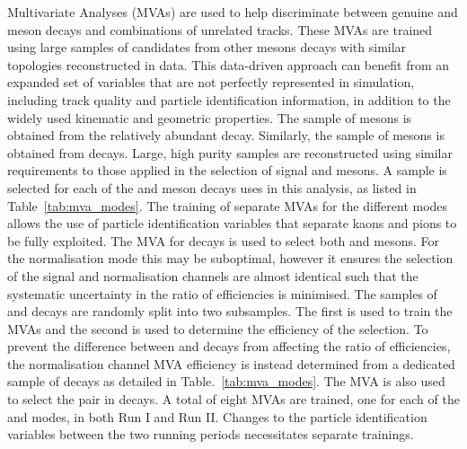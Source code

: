 Multivariate Analyses (MVAs) are used to help discriminate between genuine \Dsp and \phiz meson decays and combinations of unrelated tracks. 
These MVAs are trained using large samples of candidates from other \B mesons decays with similar topologies reconstructed in data. 
This data-driven approach can benefit from an expanded set of variables that are not perfectly represented in simulation, including track quality and particle identification information, in addition to the widely used kinematic and geometric properties.
The sample of \Dsp mesons is obtained from the relatively abundant \decay{\Bsb}{\Dsp\pim} decay. Similarly, the sample of \phiz mesons is obtained from \decay{\Bs}{\jpsi\phiz} decays. Large, high purity samples are reconstructed using similar requirements to those applied in the selection of signal \Dsp and \phiz mesons.
A sample is selected for each of the \Dsp and \phiz meson decays uses in this analysis, as listed in Table~\ref{tab:mva_modes}. 
The training of separate MVAs for the different \Dsp modes allows the use of particle identification variables that separate kaons and pions to be fully exploited.
The MVA for \decay{\phiz}{\Kp\Km} decays is used to select both \phiz and \Dzb mesons. For the normalisation mode this may be suboptimal, however it ensures the selection of the signal and normalisation channels are almost identical such that the systematic uncertainty in the ratio of efficiencies is minimised.
The samples of \decay{\Bsb}{\Dsp\pim} and \decay{\Bs}{\jpsi\phiz} decays are randomly split into two subsamples. The first is used to train the MVAs and the second is used to determine the efficiency of the selection. To prevent the difference between \phiz and \Dzb decays from affecting the ratio of efficiencies, the normalisation channel MVA efficiency is instead determined from a dedicated sample of \decay{\Dzb}{\Kp\Km} decays as detailed in Table.~\ref{tab:mva_modes}. The \decay{\phiz}{\Kp\Km} MVA is also used to select the \Kp\Km pair in \decay{\Bp}{\Dsp\Kp\Km} decays.
A total of eight MVAs are trained, one for each of the \Dsp and \phiz modes, in both Run I and Run II. Changes to the particle identification variables between the two running periods necessitates separate trainings. 


